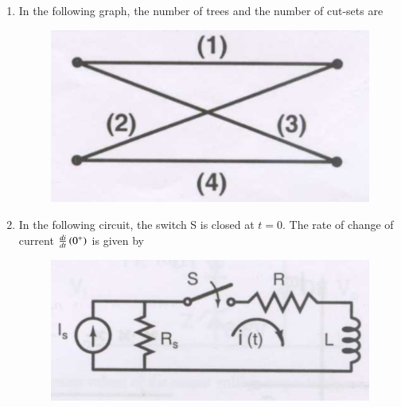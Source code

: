 \documentclass[a4paper, 11pt]{article}
\begin{document}
\begin{enumerate}
    \hfill{}
\newpage
    \item In the following graph, the number of trees  and the number of cut-sets  are
    \begin{figure}[H]
        \centering
        \includegraphics[width=0.4\columnwidth]{figs/q7.png}
        \caption*{}
        \label{fig:q7}
    \end{figure}
    
    \begin{enumerate}
    \end{enumerate}

    \hfill{}

    \item In the following circuit, the switch S is closed at $t=0$. The rate of change of current $\frac{di}{dt}\left(0^+\right)$ is given by
    \begin{figure}[H]
        \centering
        \includegraphics[width=0.6\columnwidth]{figs/q8.png}
        \caption*{}
        \label{fig:q8}
    \end{figure}
    
    \begin{enumerate}
    \end{enumerate}
    

\end{enumerate}
\end{document}
